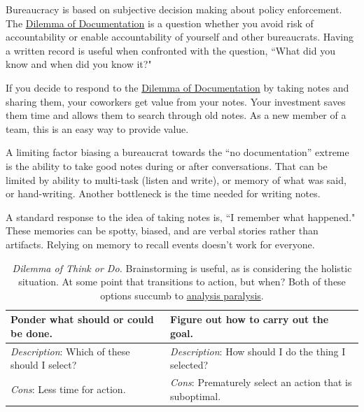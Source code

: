 Bureaucracy is based on subjective decision making about policy enforcement. The \hyperref[table:dilemma-personal-notes-or-no-notes]{Dilemma of Documentation} is a question whether you avoid risk of accountability or enable accountability of yourself and other bureaucrats. Having a written record is useful when confronted with the question, ``What did you know and when did you know it?"

If you decide to respond to the \hyperref[table:dilemma-personal-notes-or-no-notes]{Dilemma of Documentation} by taking notes and sharing them, your coworkers get value from your notes. Your investment saves them time and allows them to search through old notes. 
As a new member of a team, this is an easy way to provide value.  

A limiting factor biasing a bureaucrat towards the ``no documentation'' extreme is the ability to take good notes during or after conversations. That can be limited by ability to multi-task (listen and write), or memory of what was said, or hand-writing. Another bottleneck is the time needed for writing notes.

A standard response to the idea of taking notes is, ``I remember what happened." These memories can be spotty, biased, and are verbal stories rather than artifacts. 
Relying on memory to recall events doesn't work for everyone. 

\begin{center}
\begin{table}[H] %
\begin{tabular}{ | m{\dilemmatablewidth}| m{\dilemmatablewidth} | } 
  \hline
  \textbf{Ponder what should or could be done.} &
  \textbf{Figure out how to carry out the goal.}\\
  \hline
  \textit{Description}: Which of these should I select? & 
  \textit{Description}: How should I do the thing I selected? \\
  \hline
  \textit{Cons}: Less time for action. & 
  \textit{Cons}: Prematurely select an action that is suboptimal. \\
  \hline
\end{tabular}
\caption{\textit{Dilemma of Think or Do.}
Brainstorming is useful, as is considering the holistic situation. At some point that transitions to action, but when? %
Both of these options succumb to \href{https://en.wikipedia.org/wiki/Analysis_paralysis}{analysis paralysis}.
}
\label{table:dilemma-personal-forest-vs-trees}
\end{table}
\end{center}

